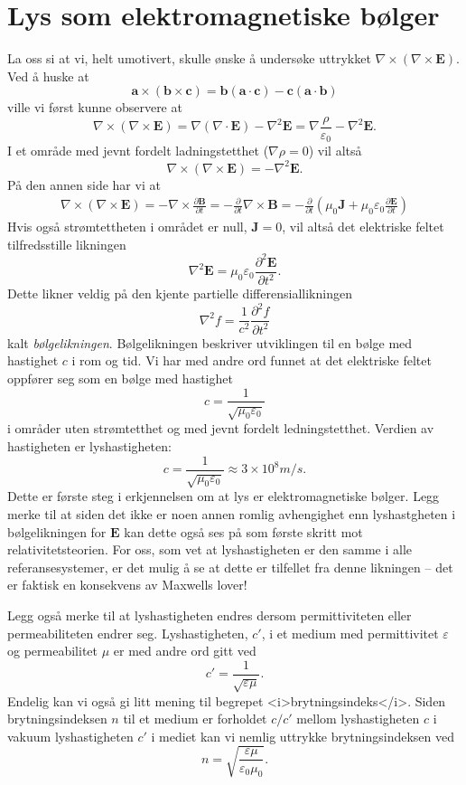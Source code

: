 \documentclass[twoside,utf8]{article}
\begin{document}
\section{Lys som elektromagnetiske bølger}
La oss si at vi, helt umotivert, skulle ønske å undersøke uttrykket $\nabla \times (\nabla \times \mathbf{E})$. Ved å huske at
$$
\mathbf{a}\times (\mathbf{b} \times \mathbf{c}) = \mathbf{b}(\mathbf{a}\cdot \mathbf{c})-\mathbf{c}(\mathbf{a} \cdot \mathbf{b})
$$
ville vi først kunne observere at
$$
\nabla \times (\nabla \times \mathbf{E}) = \nabla (\nabla \cdot \mathbf{E}) - \nabla^2 \mathbf{E} = \nabla \frac{\rho}{\varepsilon_0} - \nabla^2 \mathbf{E}.
$$
I et område med jevnt fordelt ladningstetthet ($\nabla \rho = 0$) vil altså
$$
\nabla \times (\nabla \times \mathbf{E}) = - \nabla^2 \mathbf{E}.
$$
På den annen side har vi at
$$
\begin{aligned}
\nabla \times (\nabla \times \mathbf{E})
=
- \nabla \times \frac{\partial \mathbf{B}}{\partial t}
=
- \frac{\partial}{\partial t} \nabla \times \mathbf{B}
=
- \frac{\partial}{\partial t}
\left(
\mu_0 \mathbf{J}
+
\mu_0 \varepsilon_0 \frac{\partial \mathbf{E}}{\partial t}
\right)
\end{aligned}
$$
Hvis også strømtettheten i området er null, $\mathbf{J}=0$, vil altså det elektriske feltet tilfredsstille likningen
$$
\nabla^2 \mathbf{E}
=
\mu_0 \varepsilon_0 \frac{\partial^2 \mathbf{E}}{\partial t^2}.
$$
Dette likner veldig på den kjente partielle differensiallikningen
$$
\nabla^2 f
=
\frac{1}{c^2} \frac{\partial^2 f}{\partial t^2}
$$
kalt {\it bølgelikningen}. Bølgelikningen beskriver utviklingen til en bølge med hastighet $c$ i rom og tid. Vi har med andre ord funnet at det elektriske feltet oppfører seg som en bølge med hastighet
$$
c = \frac{1}{\sqrt{\mu_0 \varepsilon_0}}
$$
i områder uten strømtetthet og med jevnt fordelt ledningstetthet. Verdien av hastigheten er lyshastigheten:
$$
c = \frac{1}{\sqrt{\mu_0 \varepsilon_0}} \approx 3 \times 10^8 m/s.
$$
Dette er første steg i erkjennelsen om at lys er elektromagnetiske bølger. Legg merke til at siden det ikke er noen annen romlig avhengighet enn lyshastgheten i bølgelikningen for $\mathbf{E}$ kan dette også ses på som første skritt mot relativitetsteorien. For oss, som vet at lyshastigheten er den samme i alle referansesystemer, er det mulig å se at dette er tilfellet fra denne likningen -- det er faktisk en konsekvens av Maxwells lover!

Legg også merke til at lyshastigheten endres dersom permittiviteten eller permeabiliteten endrer seg. Lyshastigheten, $c'$, i et medium med permittivitet $\varepsilon$ og permeabilitet $\mu$ er med andre ord gitt ved
$$
	c' = \frac{1}{\sqrt{\varepsilon\mu}}.
$$
Endelig kan vi også gi litt mening til begrepet <i>brytningsindeks</i>. Siden brytningsindeksen $n$ til et medium er forholdet $c/c'$ mellom lyshastigheten $c$ i vakuum lyshastigheten $c'$ i mediet kan vi nemlig uttrykke brytningsindeksen ved
$$
n = \sqrt{\frac{\varepsilon\mu}{\varepsilon_0\mu_0}}.
$$
\end{document}
